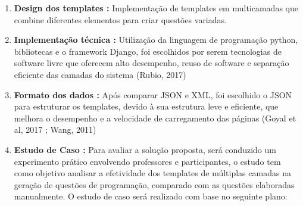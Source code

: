 \begin{enumerate}[label=\textbf{\alph*)}]
    \item \textbf{Design dos templates :}  Implementação de templates em multicamadas que combine diferentes elementos para criar questões variadas.  
    \item \textbf{Implementação técnica :}  Utilização da linguagem de programação python, bibliotecas e o framework Django, foi escolhidos por serem tecnologias de software livre que oferecem alto desempenho, reuso de software e separação eficiente das camadas do sistema (Rubio, 2017)
    \item \textbf{Formato dos dados :}  Após comparar JSON e XML, foi escolhido o JSON para estruturar os templates, devido à sua estrutura leve e eficiente, que melhora o desempenho e a velocidade de carregamento das páginas (Goyal et al, 2017 ; Wang, 2011)
    \item \textbf{Estudo de Caso :}  Para avaliar a solução proposta, será conduzido um experimento prático envolvendo professores e participantes, o estudo tem como objetivo analisar a efetividade dos templates de múltiplas camadas na geração de questões de programação, comparado com as questões elaboradas manualmente. O estudo de caso será realizado com base no seguinte plano:


\end{enumerate}

